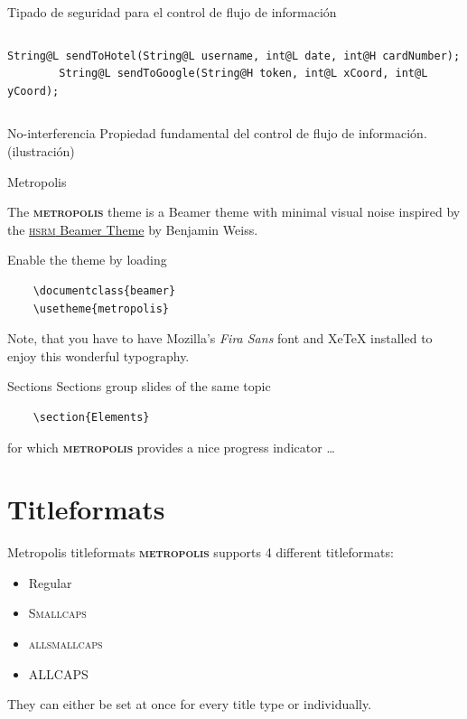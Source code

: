 \documentclass[aspectratio=169,10pt]{beamer}
\newcommand{\themename}{\textbf{\textsc{metropolis}}\xspace}
\begin{document}
\begin{frame}[fragile]{Tipado de seguridad para el control de flujo de información}
\begin{columns}[T,onlytextwidth]
\begin{onlyenv}
\begin{lstlisting}[escapechar=?]
        String@L sendToHotel(String@L username, int@L date, int@H cardNumber);
        String@L sendToGoogle(String@H token, int@L xCoord, int@L yCoord);
      \end{lstlisting}
    \end{onlyenv}
  \end{columns}

\end{frame}

\begin{frame}[fragile]{No-interferencia}
  Propiedad fundamental del control de flujo de información.\\

  (ilustración)
\end{frame}

\begin{frame}[fragile]{Metropolis}

  The \themename theme is a Beamer theme with minimal visual noise
  inspired by the \href{https://github.com/hsrmbeamertheme/hsrmbeamertheme}{\textsc{hsrm} Beamer
  Theme} by Benjamin Weiss.

  Enable the theme by loading

  \begin{verbatim}    \documentclass{beamer}
    \usetheme{metropolis}\end{verbatim}

  Note, that you have to have Mozilla's \emph{Fira Sans} font and XeTeX
  installed to enjoy this wonderful typography.
\end{frame}
\begin{frame}[fragile]{Sections}
  Sections group slides of the same topic

  \begin{verbatim}    \section{Elements}\end{verbatim}

  for which \themename provides a nice progress indicator \ldots
\end{frame}

\section{Titleformats}

\begin{frame}{Metropolis titleformats}
	\themename supports 4 different titleformats:
	\begin{itemize}
		\item Regular
		\item \textsc{Smallcaps}
		\item \textsc{allsmallcaps}
		\item ALLCAPS
	\end{itemize}
	They can either be set at once for every title type or individually.
\end{frame}
\end{document}
